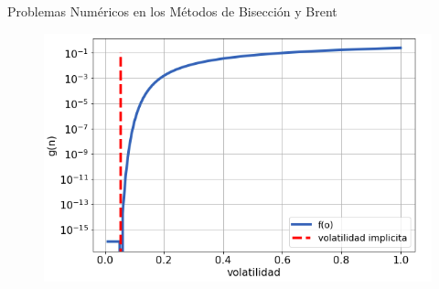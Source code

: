 \documentclass{beamer}
\begin{document}
\begin{frame}{Problemas Num\'ericos en los M\'etodos de Bisecci\'on y Brent}

    \begin{figure}[!tbp]
        \includegraphics[scale=0.5]{g}
    \end{figure}

\end{frame}
\end{document}
